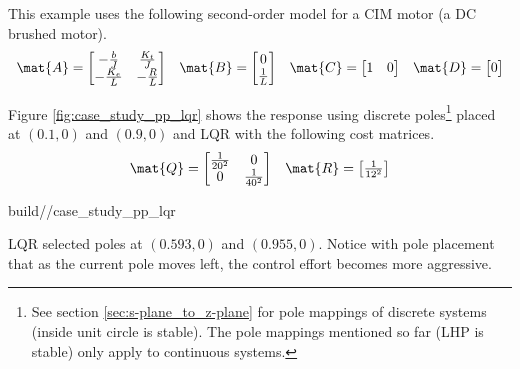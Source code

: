 This example uses the following second-order \gls{model} for a CIM motor (a DC
brushed motor).
\begin{align*}
  \begin{array}{cccc}
    \mat{A} = \begin{bmatrix}
      -\frac{b}{J} & \frac{K_t}{J} \\
      -\frac{K_e}{L} & -\frac{R}{L}
    \end{bmatrix} &
    \mat{B} = \begin{bmatrix}
      0 \\
      \frac{1}{L}
    \end{bmatrix} &
    \mat{C} = \begin{bmatrix}
      1 & 0
    \end{bmatrix} &
    \mat{D} = \begin{bmatrix}
      0
    \end{bmatrix}
  \end{array}
\end{align*}

Figure \ref{fig:case_study_pp_lqr} shows the response using discrete
poles\footnote{See section \ref{sec:s-plane_to_z-plane} for pole mappings of
discrete systems (inside unit circle is stable). The pole mappings mentioned so
far (LHP is stable) only apply to continuous systems.} placed at $(0.1, 0)$ and
$(0.9, 0)$ and LQR with the following cost matrices.
\begin{align*}
  \begin{array}{cc}
    \mat{Q} = \begin{bmatrix}
      \frac{1}{20^2} & 0 \\
      0 & \frac{1}{40^2}
    \end{bmatrix} &
    \mat{R} = \begin{bmatrix}
      \frac{1}{12^2}
    \end{bmatrix}
  \end{array}
\end{align*}
\begin{svg}{build/\chapterpath/case_study_pp_lqr}
  \caption{Second-order CIM motor response with pole placement and LQR}
  \label{fig:case_study_pp_lqr}
\end{svg}

LQR selected poles at $(0.593, 0)$ and $(0.955, 0)$. Notice with pole placement
that as the current pole moves left, the \gls{control effort} becomes more
aggressive.
